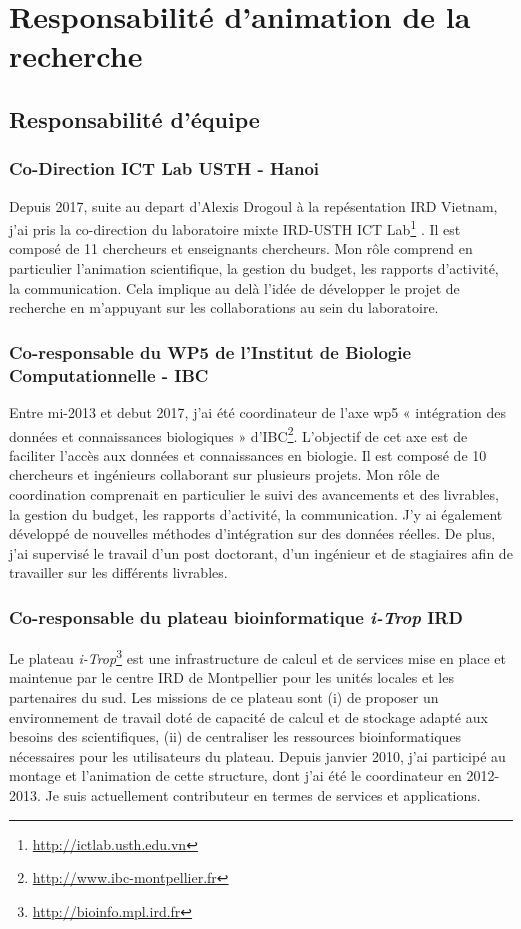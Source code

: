 \section{Responsabilité d'animation de la recherche}

\subsection*{Responsabilité d’équipe}
\subsubsection*{Co-Direction ICT Lab USTH - Hanoi} 
Depuis 2017, suite au depart d’Alexis Drogoul à la repésentation IRD Vietnam, j’ai pris la co-direction du laboratoire mixte IRD-USTH ICT Lab\footnote{\url{http://ictlab.usth.edu.vn}} . Il est composé de 11 chercheurs et enseignants chercheurs. Mon rôle comprend en particulier l’animation scientifique, la gestion du budget, les rapports d’activité, la communication. Cela implique au delà l'idée de développer le projet de recherche en m'appuyant sur les collaborations au sein du laboratoire.

\subsubsection*{Co-responsable du WP5 de l’Institut de Biologie Computationnelle - IBC} 
Entre mi-2013 et debut 2017, j’ai été coordinateur de l’axe wp5 « intégration des données et connaissances biologiques » d'IBC\footnote{\url{http://www.ibc-montpellier.fr}}. L’objectif de cet axe est de faciliter l’accès aux données et connaissances en biologie. Il est composé de 10 chercheurs et ingénieurs collaborant sur plusieurs projets. Mon rôle de coordination comprenait en particulier le suivi des avancements et des livrables, la gestion du budget, les rapports d’activité, la communication. J’y ai également développé de nouvelles méthodes d’intégration sur des données réelles. De plus, j’ai supervisé le travail d’un post doctorant, d’un ingénieur et de stagiaires afin de travailler sur les différents livrables.  


\subsubsection*{Co-responsable du plateau bioinformatique \textit{i-Trop} IRD} 
Le plateau  \textit{i-Trop}\footnote{\url{http://bioinfo.mpl.ird.fr}} est une infrastructure de calcul et de services mise en place et maintenue par le centre IRD de Montpellier pour les unités locales et les partenaires du sud. Les missions de ce plateau sont (i) de proposer un environnement de travail doté de capacité de calcul et de stockage adapté aux besoins des scientifiques, (ii) de centraliser les ressources bioinformatiques nécessaires pour les utilisateurs du plateau. Depuis janvier 2010, j’ai participé au montage et l’animation de cette structure, dont j’ai été le coordinateur en 2012-2013. Je suis actuellement contributeur en termes de services et applications.


